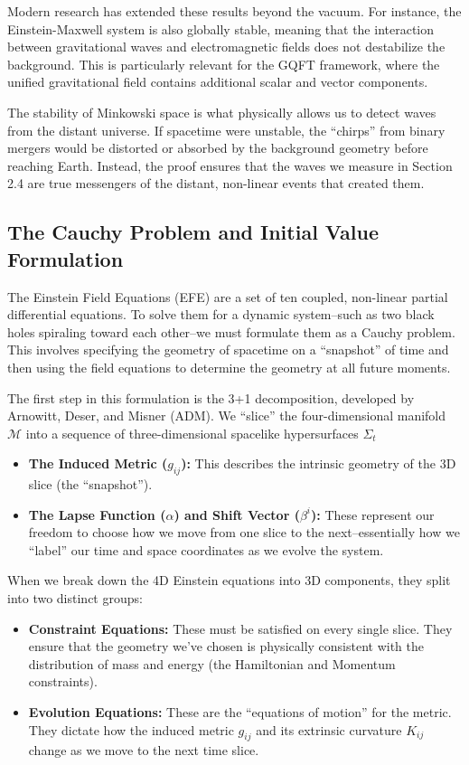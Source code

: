 Modern research has extended these results beyond the vacuum. For instance, the Einstein-Maxwell system is also globally stable, meaning that the interaction between gravitational waves and electromagnetic fields does not destabilize the background. This is particularly relevant for the GQFT framework, where the unified gravitational field contains additional scalar and vector components.

The stability of Minkowski space is what physically allows us to detect waves from the distant universe. If spacetime were unstable, the ``chirps'' from binary mergers would be distorted or absorbed by the background geometry before reaching Earth. Instead, the proof ensures that the waves we measure in Section 2.4 are true messengers of the distant, non-linear events that created them.

\subsection{The Cauchy Problem and Initial Value Formulation} The Einstein Field Equations (EFE) are a set of ten coupled, non-linear partial differential equations. To solve them for a dynamic system--such as two black holes spiraling toward each other--we must formulate them as a Cauchy problem. This involves specifying the geometry of spacetime on a ``snapshot'' of time and then using the field equations to determine the geometry at all future moments.

The first step in this formulation is the 3+1 decomposition, developed by Arnowitt, Deser, and Misner (ADM). We ``slice'' the four-dimensional manifold $\mathcal{M}$ into a sequence of three-dimensional spacelike hypersurfaces $\Sigma_t$
\begin{itemize}
  \item \textbf{The Induced Metric ($g_{ij}$):} This describes the intrinsic geometry of the 3D slice (the ``snapshot'').
  \item \textbf{The Lapse Function ($\alpha$) and Shift Vector ($\beta^i$):} These represent our freedom to choose how we move from one slice to the next--essentially how we ``label'' our time and space coordinates as we evolve the system.
\end{itemize}

When we break down the 4D Einstein equations into 3D components, they split into two distinct groups:
\begin{itemize}
  \item \textbf{Constraint Equations:} These must be satisfied on every single slice. They ensure that the geometry we've chosen is physically consistent with the distribution of mass and energy (the Hamiltonian and Momentum constraints).
  \item \textbf{Evolution Equations:} These are the ``equations of motion'' for the metric. They dictate how the induced metric $g_{ij}$ and its extrinsic curvature $K_{ij}$ change as we move to the next time slice.
\end{itemize}

